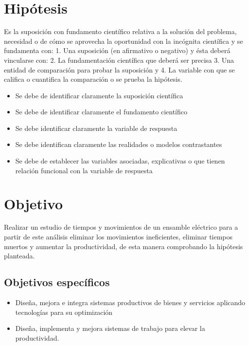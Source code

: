         \section{Hipótesis}
        
        Es la suposición con fundamento científico relativa a la solución del problema, necesidad o de cómo se aprovecha la oportunidad con la incógnita científica y se fundamenta con: 1. Una suposición (en afirmativo o negativo) y ésta deberá vincularse con:
        2. La fundamentación científica que deberá ser precisa 3. Una entidad de comparación para probar la suposición y
        4. La variable con que se califica o cuantifica la comparación o se prueba la hipótesis.
        
        \begin{itemize}
            \item Se debe de identificar claramente la suposición científica
            \item Se debe de identificar claramente el fundamento científico
            \item Se debe identificar claramente la variable de respuesta
            \item Se debe identifican claramente las realidades o modelos contrastantes
            \item Se debe de establecer las variables asociadas, explicativas o que tienen relación funcional con la variable de respuesta
        \end{itemize}
        \section{Objetivo}
        
        Realizar un estudio de tiempos y movimientos de un ensamble eléctrico para a partir de este análisis eliminar los movimientos ineficientes, eliminar tiempos muertos y aumentar la productividad, de esta manera comprobando la hipótesis planteada.
        
        
        \subsection{Objetivos específicos }
        
        \begin{itemize}
            \item Diseña, mejora e integra sistemas productivos de bienes y servicios aplicando tecnologías para su optimización
            \item Diseña, implementa y mejora sistemas de trabajo para elevar la productividad.
        \end{itemize}
        
